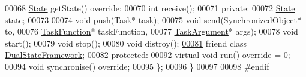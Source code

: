 \begin{DoxyCode}
00068         \hyperlink{classdsf_1_1_runnable_a8eb63b21a0accc7a6a2a05f18e257991}{State} getState() \textcolor{keyword}{override};
00070         \textcolor{keywordtype}{int} receive();
00071     \textcolor{keyword}{private}:
00072         \hyperlink{classdsf_1_1_runnable_a8eb63b21a0accc7a6a2a05f18e257991}{State} state;
00073         
00074         \textcolor{keywordtype}{void} push(\hyperlink{classdsf_1_1_task}{Task}* task);
00075         \textcolor{keywordtype}{void} send(\hyperlink{classdsf_1_1_synchronized_object}{SynchronizedObject}* to,
00076                   \hyperlink{namespacedsf_aa16e735f29587f4485b56fc46746f7a9}{TaskFunction}* taskFunction,
00077                   \hyperlink{classyc_1_1_any}{TaskArgument}* args);
00078         \textcolor{keywordtype}{void} start();
00079         \textcolor{keywordtype}{void} stop();
00080         \textcolor{keywordtype}{void} distroy();
\hypertarget{_synchronized_object_8h_source_l00081}{}\hyperlink{classdsf_1_1_synchronized_object_a86db03c65431cb461cc8abf33bd2e74a}{00081}         \textcolor{keyword}{friend} \textcolor{keyword}{class }\hyperlink{classdsf_1_1_dual_state_framework}{DualStateFramework};
00082     \textcolor{keyword}{protected}:
00092         \textcolor{keyword}{virtual} \textcolor{keywordtype}{void} run() \textcolor{keyword}{override} = 0;
00094         \textcolor{keywordtype}{void} synchronise() \textcolor{keyword}{override};
00095     \};
00096 \}
00097 
00098 \textcolor{preprocessor}{#endif}
\end{DoxyCode}
